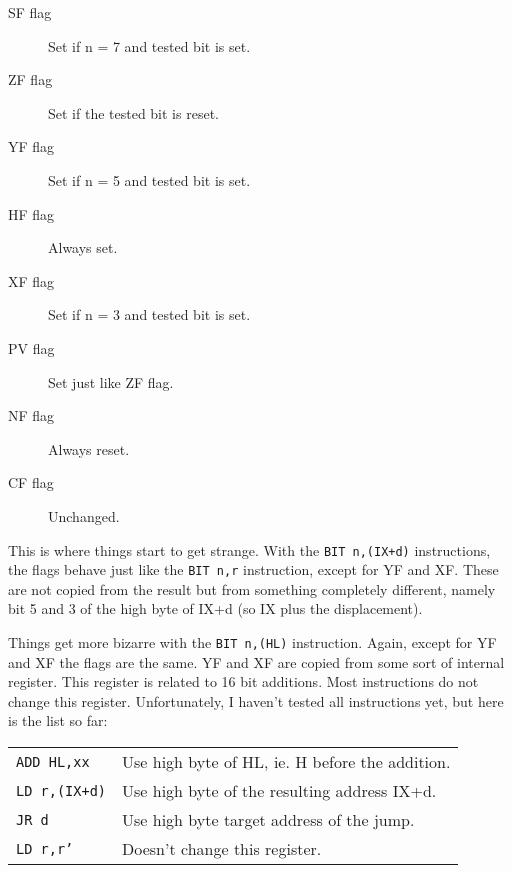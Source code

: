 \begin{description}
    \item[SF flag]
    Set if n = 7 and tested bit is set.

    \item[ZF flag]
    Set if the tested bit is reset.

    \item[YF flag]
    Set if n = 5 and tested bit is set.

    \item[HF flag]
    Always set.

    \item[XF flag]
    Set if n = 3 and tested bit is set.

    \item[PV flag]
    Set just like ZF flag.

    \item[NF flag]
    Always reset. 

    \item[CF flag]
    Unchanged.

\end{description}

This is where things start to get strange. With the {\tt BIT n,(IX+d)} instructions, the flags behave just like the {\tt BIT n,r} instruction, except for YF and XF. These are not copied from the result but from something completely different, namely bit 5 and 3 of the high byte of IX+d (so IX plus the displacement).

Things get more bizarre with the {\tt BIT n,(HL)} instruction. Again, except for YF and XF the flags are the same. YF and XF are copied from some sort of internal register. This register is related to 16 bit additions. Most instructions do not change this register. Unfortunately, I haven't tested all instructions yet, but here is the list so far:

\begin{tabularx}{\linewidth}{@{}lX}
    {\tt ADD HL,xx}
        & Use high byte of HL, ie. H before the addition. \\

    {\tt LD r,(IX+d)}
        & Use high byte of the resulting address IX+d. \\

    {\tt JR d}
        & Use high byte target address of the jump. \\

    {\tt LD r,r'}
        & Doesn't change this register. \\
\end{tabularx}


